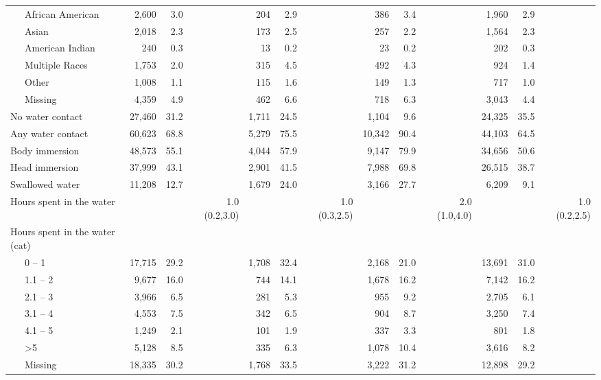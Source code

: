 \documentclass[12pt]{article}\usepackage[]{graphicx}\usepackage[]{color}
\begin{document}
\begin{landscape}
\begin{table}[h!tb]
\begin{center}
\begin{footnotesize}
\begin{tabular}{l rrr rrr rrr rrr}
  ~~~African American &  2,600 & 3.0 &  &   204 & 2.9 &  &    386 & 3.4 &  &  1,960 & 2.9 &  \\ 
  ~~~Asian &  2,018 & 2.3 &  &   173 & 2.5 &  &    257 & 2.2 &  &  1,564 & 2.3 &  \\ 
  ~~~American Indian &    240 & 0.3 &  &    13 & 0.2 &  &     23 & 0.2 &  &    202 & 0.3 &  \\ 
  ~~~Multiple Races &  1,753 & 2.0 &  &   315 & 4.5 &  &    492 & 4.3 &  &    924 & 1.4 &  \\ 
  ~~~Other &  1,008 & 1.1 &  &   115 & 1.6 &  &    149 & 1.3 &  &    717 & 1.0 &  \\ 
  ~~~Missing &  4,359 & 4.9 &  &   462 & 6.6 &  &    718 & 6.3 &  &  3,043 & 4.4 &  \\ 
  No water contact & 27,460 & 31.2 &  & 1,711 & 24.5 &  &  1,104 & 9.6 &  & 24,325 & 35.5 &  \\ 
  Any water contact & 60,623 & 68.8 &  & 5,279 & 75.5 &  & 10,342 & 90.4 &  & 44,103 & 64.5 &  \\ 
  Body immersion & 48,573 & 55.1 &  & 4,044 & 57.9 &  &  9,147 & 79.9 &  & 34,656 & 50.6 &  \\ 
  Head immersion & 37,999 & 43.1 &  & 2,901 & 41.5 &  &  7,988 & 69.8 &  & 26,515 & 38.7 &  \\ 
  Swallowed water & 11,208 & 12.7 &  & 1,679 & 24.0 &  &  3,166 & 27.7 &  &  6,209 & 9.1 &  \\ 
  Hours spent in the water &  &  & 1.0 (0.2,3.0) &  &  & 1.0 (0.3,2.5) &  &  & 2.0 (1.0,4.0) &  &  & 1.0 (0.2,2.5) \\ 
  Hours spent in the water (cat) &  &  &  &  &  &  &  &  &  &  &  &  \\ 
  ~~~0 -- 1 & 17,715 & 29.2 &  & 1,708 & 32.4 &  &  2,168 & 21.0 &  & 13,691 & 31.0 &  \\ 
  ~~~1.1 -- 2 &  9,677 & 16.0 &  &   744 & 14.1 &  &  1,678 & 16.2 &  &  7,142 & 16.2 &  \\ 
  ~~~2.1 -- 3 &  3,966 & 6.5 &  &   281 & 5.3 &  &    955 & 9.2 &  &  2,705 & 6.1 &  \\ 
  ~~~3.1 -- 4 &  4,553 & 7.5 &  &   342 & 6.5 &  &    904 & 8.7 &  &  3,250 & 7.4 &  \\ 
  ~~~4.1 -- 5 &  1,249 & 2.1 &  &   101 & 1.9 &  &    337 & 3.3 &  &    801 & 1.8 &  \\ 
  ~~~>5 &  5,128 & 8.5 &  &   335 & 6.3 &  &  1,078 & 10.4 &  &  3,616 & 8.2 &  \\ 
  ~~~Missing & 18,335 & 30.2 &  & 1,768 & 33.5 &  &  3,222 & 31.2 &  & 12,898 & 29.2 &  \\ 
  
\hline
\end{tabular}
\end{footnotesize}
\end{center}
\end{table}
\end{landscape}
\end{document}

